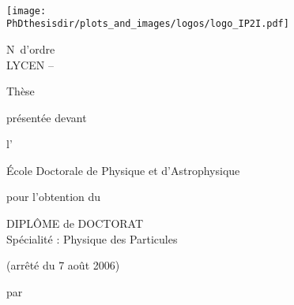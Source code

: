 \thispagestyle{empty}
\begin{center}
\large\sffamily

~

\vspace{-2\baselineskip}

\hspace{1.2cm}
\texttt{[image: \\PhDthesisdir/plots\_and\_images/logos/logo\_IP2I.pdf]}
\hfill
\begin{minipage}[t]{.4\textwidth}
\vspace{-2.35cm}
\vspace{\baselineskip}
\begin{flushright}
N\degree\ d'ordre \NordreNNT\\
LYCEN -- \LYCEN
\end{flushright}
\end{minipage}
\hspace{1cm}

\vspace{1cm}
\vspace{\baselineskip}

{\LARGE Thèse}

\vspace{\baselineskip}

présentée devant

\vspace{\baselineskip}

{\Large l'\insertinstitute}

\vspace{\baselineskip}

{\Large École Doctorale de Physique et d'Astrophysique}

\vspace{\baselineskip}

pour l'obtention du

\vspace{\baselineskip}

{\Large DIPLÔME de DOCTORAT}\\
Spécialité : Physique des Particules

\vspace{\baselineskip}

(arrêté du 7 août 2006)

\vspace{\baselineskip}

par

\vspace{\baselineskip}

{\LARGE \insertauthor}


\end{center}

